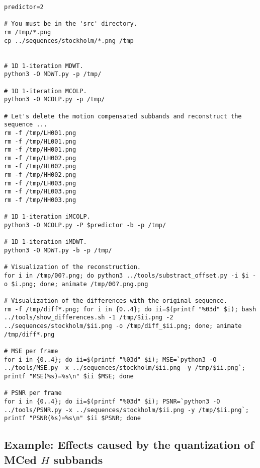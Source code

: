 \begin{verbatim}
predictor=2

# You must be in the 'src' directory.
rm /tmp/*.png
cp ../sequences/stockholm/*.png /tmp


# 1D 1-iteration MDWT.
python3 -O MDWT.py -p /tmp/

# 1D 1-iteration MCOLP.
python3 -O MCOLP.py -p /tmp/

# Let's delete the motion compensated subbands and reconstruct the sequence ...
rm -f /tmp/LH001.png
rm -f /tmp/HL001.png
rm -f /tmp/HH001.png
rm -f /tmp/LH002.png
rm -f /tmp/HL002.png
rm -f /tmp/HH002.png
rm -f /tmp/LH003.png
rm -f /tmp/HL003.png
rm -f /tmp/HH003.png

# 1D 1-iteration iMCOLP.
python3 -O MCOLP.py -P $predictor -b -p /tmp/

# 1D 1-iteration iMDWT.
python3 -O MDWT.py -b -p /tmp/

# Visualization of the reconstruction.
for i in /tmp/00?.png; do python3 ../tools/substract_offset.py -i $i -o $i.png; done; animate /tmp/00?.png.png

# Visualization of the differences with the original sequence.
rm -f /tmp/diff*.png; for i in {0..4}; do ii=$(printf "%03d" $i); bash ../tools/show_differences.sh -1 /tmp/$ii.png -2 ../sequences/stockholm/$ii.png -o /tmp/diff_$ii.png; done; animate /tmp/diff*.png

# MSE per frame
for i in {0..4}; do ii=$(printf "%03d" $i); MSE=`python3 -O ../tools/MSE.py -x ../sequences/stockholm/$ii.png -y /tmp/$ii.png`; printf "MSE(%s)=%s\n" $ii $MSE; done

# PSNR per frame
for i in {0..4}; do ii=$(printf "%03d" $i); PSNR=`python3 -O ../tools/PSNR.py -x ../sequences/stockholm/$ii.png -y /tmp/$ii.png`; printf "PSNR(%s)=%s\n" $ii $PSNR; done
\end{verbatim}


\subsection*{Example: Effects caused by the quantization of MCed $H$ subbands}

